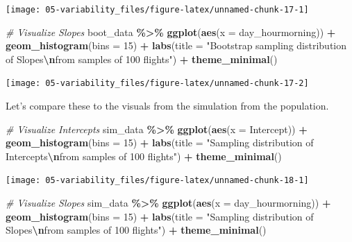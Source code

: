 \documentclass[
]{book}
\newenvironment{Shaded}{\begin{snugshade}}{\end{snugshade}}
\newcommand{\AttributeTok}[1]{\textcolor[rgb]{0.13,0.29,0.53}{#1}}
\newcommand{\CommentTok}[1]{\textcolor[rgb]{0.56,0.35,0.01}{\textit{#1}}}
\newcommand{\DecValTok}[1]{\textcolor[rgb]{0.00,0.00,0.81}{#1}}
\newcommand{\FunctionTok}[1]{\textcolor[rgb]{0.13,0.29,0.53}{\textbf{#1}}}
\newcommand{\NormalTok}[1]{#1}
\newcommand{\SpecialCharTok}[1]{\textcolor[rgb]{0.81,0.36,0.00}{\textbf{#1}}}
\newcommand{\StringTok}[1]{\textcolor[rgb]{0.31,0.60,0.02}{#1}}
\begin{document}
\begin{center}\texttt{[image: 05-variability\_files/figure-latex/unnamed-chunk-17-1]} \end{center}

\begin{Shaded}
\begin{Highlighting}[]
\CommentTok{\# Visualize Slopes}
\NormalTok{boot\_data }\SpecialCharTok{\%\textgreater{}\%} 
    \FunctionTok{ggplot}\NormalTok{(}\FunctionTok{aes}\NormalTok{(}\AttributeTok{x =}\NormalTok{ day\_hourmorning)) }\SpecialCharTok{+}
    \FunctionTok{geom\_histogram}\NormalTok{(}\AttributeTok{bins =} \DecValTok{15}\NormalTok{) }\SpecialCharTok{+}
    \FunctionTok{labs}\NormalTok{(}\AttributeTok{title =} \StringTok{"Bootstrap sampling distribution of Slopes}\SpecialCharTok{\textbackslash{}n}\StringTok{from samples of 100 flights"}\NormalTok{) }\SpecialCharTok{+}
    \FunctionTok{theme\_minimal}\NormalTok{()}
\end{Highlighting}
\end{Shaded}

\begin{center}\texttt{[image: 05-variability\_files/figure-latex/unnamed-chunk-17-2]} \end{center}

Let's compare these to the visuals from the simulation from the population.

\begin{Shaded}
\begin{Highlighting}[]
\CommentTok{\# Visualize Intercepts}
\NormalTok{sim\_data }\SpecialCharTok{\%\textgreater{}\%} 
    \FunctionTok{ggplot}\NormalTok{(}\FunctionTok{aes}\NormalTok{(}\AttributeTok{x =}\NormalTok{ Intercept)) }\SpecialCharTok{+}
    \FunctionTok{geom\_histogram}\NormalTok{(}\AttributeTok{bins =} \DecValTok{15}\NormalTok{) }\SpecialCharTok{+}
    \FunctionTok{labs}\NormalTok{(}\AttributeTok{title =} \StringTok{"Sampling distribution of Intercepts}\SpecialCharTok{\textbackslash{}n}\StringTok{from samples of 100 flights"}\NormalTok{) }\SpecialCharTok{+}
    \FunctionTok{theme\_minimal}\NormalTok{()}
\end{Highlighting}
\end{Shaded}

\begin{center}\texttt{[image: 05-variability\_files/figure-latex/unnamed-chunk-18-1]} \end{center}

\begin{Shaded}
\begin{Highlighting}[]
\CommentTok{\# Visualize Slopes}
\NormalTok{sim\_data }\SpecialCharTok{\%\textgreater{}\%} 
    \FunctionTok{ggplot}\NormalTok{(}\FunctionTok{aes}\NormalTok{(}\AttributeTok{x =}\NormalTok{ day\_hourmorning)) }\SpecialCharTok{+}
    \FunctionTok{geom\_histogram}\NormalTok{(}\AttributeTok{bins =} \DecValTok{15}\NormalTok{) }\SpecialCharTok{+}
    \FunctionTok{labs}\NormalTok{(}\AttributeTok{title =} \StringTok{"Sampling distribution of Slopes}\SpecialCharTok{\textbackslash{}n}\StringTok{from samples of 100 flights"}\NormalTok{) }\SpecialCharTok{+}
    \FunctionTok{theme\_minimal}\NormalTok{()}
\end{Highlighting}
\end{Shaded}
\end{document}
